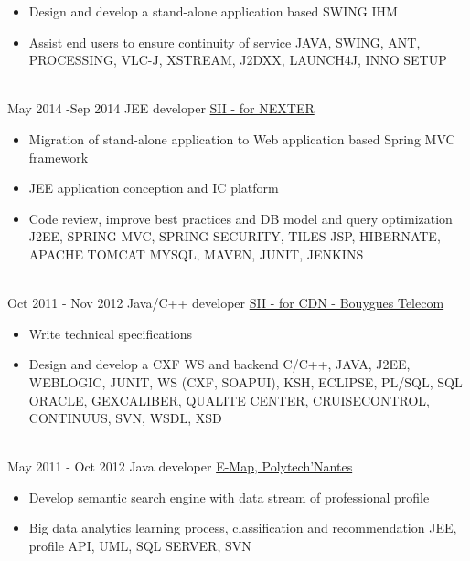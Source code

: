 \documentclass[letterpaper]{twentysecondcv_en} %
\begin{document}
\begin{twenty}
{\begin{itemize}
        	\item  Design and develop a stand-alone application based SWING IHM
       		\item Assist end users to ensure continuity of service
	 \medskip   \newline \footnotesize  JAVA, SWING, ANT, PROCESSING, VLC-J, XSTREAM, J2DXX, LAUNCH4J, INNO SETUP	
    	\end{itemize}	
    	}
	\\   
	\twentyitem
	{May 2014 -}{Sep 2014}
	{JEE developer}
	{\href{https://www.nexter-group.fr/}{SII - for NEXTER}}
	{}
	{
	\begin{itemize}
		\item Migration of stand-alone application to Web application based Spring MVC framework 
		\item JEE application conception and IC platform
		\item Code review, improve best practices and DB model and query optimization  
	\medskip   \newline \footnotesize  J2EE, SPRING MVC, SPRING SECURITY, TILES JSP, HIBERNATE, APACHE TOMCAT MYSQL, MAVEN, JUNIT, JENKINS
	\end{itemize}
	}       
       \\
	\twentyitem
	{Oct 2011 -}  {Nov 2012}
	 {Java/C++ developer}
	{\href{https://www.jobs.bouyguestelecom.fr/}{SII - for CDN - Bouygues Telecom}}
	{}
	 {
	   \begin{itemize}
	    	\item Write technical specifications
	    	\item Design and develop a CXF WS and backend
		 \medskip   \newline\footnotesize   C/C++, JAVA, J2EE, WEBLOGIC, JUNIT, WS (CXF, SOAPUI), KSH, ECLIPSE, PL/SQL, SQL ORACLE, GEXCALIBER, QUALITE CENTER, CRUISECONTROL, CONTINUUS, SVN, WSDL, XSD
	    \end{itemize}
	    }
	   \\
	    \twentyitem
	    {May 2011 -}
	    {Oct 2012}
	    {Java developer}
	    {\href{}{E-Map, Polytech'Nantes}}
	    {}
	    {
	    \begin{itemize}
	    \item Develop semantic search engine with data stream of professional profile
	    \item Big data analytics learning process, classification and recommendation
	\medskip   \newline \footnotesize  JEE, profile API, UML, SQL SERVER, SVN
	    \end{itemize}
	    }


\end{twenty}
\end{document}
